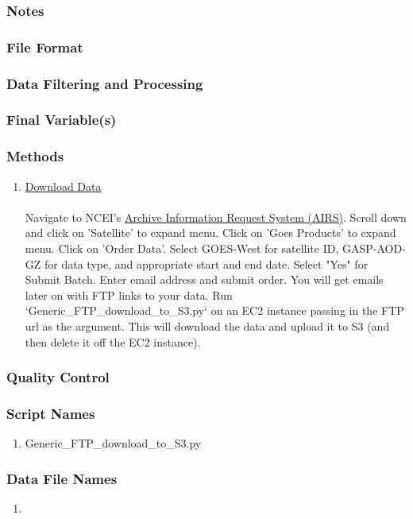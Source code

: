 \subsubsection*{Notes}

\subsubsection*{File Format}

\subsubsection*{Data Filtering and Processing}

\subsubsection*{Final Variable(s)}

\subsubsection*{Methods}

\begin{enumerate}
\item \underline{Download Data}\\\\
Navigate to NCEI's \href{https://www.ncdc.noaa.gov/has/has.dsselect}{Archive Information Request System (AIRS)}. Scroll down and click on 'Satellite' to expand menu. Click on 'Goes Products' to expand menu. Click on 'Order Data'. Select GOES-West for satellite ID, GASP-AOD-GZ for data type, and appropriate start and end date. Select "Yes" for Submit Batch. Enter email address and submit order. You will get emails later on with FTP links to your data. Run `Generic\_FTP\_download\_to\_S3.py` on an EC2 instance passing in the FTP url as the argument. This will download the data and upload it to S3 (and then delete it off the EC2 instance).
\end{enumerate}

\subsubsection*{Quality Control}

\subsubsection*{Script Names}

\begin{enumerate}
\item Generic\_FTP\_download\_to\_S3.py
\end{enumerate}

\subsubsection*{Data File Names}

\begin{enumerate}
\item 
\end{enumerate}
